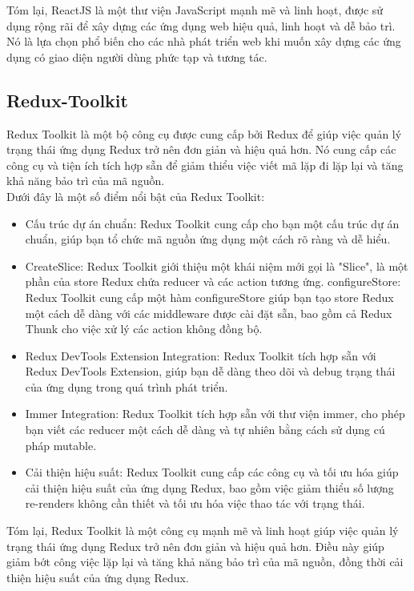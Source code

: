 \documentclass[a4paper]{article}
\begin{document}
Tóm lại, ReactJS là một thư viện JavaScript mạnh mẽ và linh hoạt, được sử dụng rộng rãi để xây dựng các ứng dụng web hiệu quả, linh hoạt và dễ bảo trì. Nó là lựa chọn phổ biến cho các nhà phát triển web khi muốn xây dựng các ứng dụng có giao diện người dùng phức tạp và tương tác.

\subsection{Redux-Toolkit}
Redux Toolkit là một bộ công cụ được cung cấp bởi Redux để giúp việc quản lý trạng thái ứng dụng Redux trở nên đơn giản và hiệu quả hơn. Nó cung cấp các công cụ và tiện ích tích hợp sẵn để giảm thiểu việc viết mã lặp đi lặp lại và tăng khả năng bảo trì của mã nguồn.\\

Dưới đây là một số điểm nổi bật của Redux Toolkit:

\begin{itemize}
    \item Cấu trúc dự án chuẩn: Redux Toolkit cung cấp cho bạn một cấu trúc dự án chuẩn, giúp bạn tổ chức mã nguồn ứng dụng một cách rõ ràng và dễ hiểu.
    \item CreateSlice: Redux Toolkit giới thiệu một khái niệm mới gọi là "Slice", là một phần của store Redux chứa reducer và các action tương ứng. configureStore: Redux Toolkit cung cấp một hàm configureStore giúp bạn tạo store Redux một cách dễ dàng với các middleware được cài đặt sẵn, bao gồm cả Redux Thunk cho việc xử lý các action không đồng bộ.
    \item Redux DevTools Extension Integration: Redux Toolkit tích hợp sẵn với Redux DevTools Extension, giúp bạn dễ dàng theo dõi và debug trạng thái của ứng dụng trong quá trình phát triển.
    \item Immer Integration: Redux Toolkit tích hợp sẵn với thư viện immer, cho phép bạn viết các reducer một cách dễ dàng và tự nhiên bằng cách sử dụng cú pháp mutable.
    \item Cải thiện hiệu suất: Redux Toolkit cung cấp các công cụ và tối ưu hóa giúp cải thiện hiệu suất của ứng dụng Redux, bao gồm việc giảm thiểu số lượng re-renders không cần thiết và tối ưu hóa việc thao tác với trạng thái.
\end{itemize}
Tóm lại, Redux Toolkit là một công cụ mạnh mẽ và linh hoạt giúp việc quản lý trạng thái ứng dụng Redux trở nên đơn giản và hiệu quả hơn. Điều này giúp giảm bớt công việc lặp lại và tăng khả năng bảo trì của mã nguồn, đồng thời cải thiện hiệu suất của ứng dụng Redux.
\end{document}

